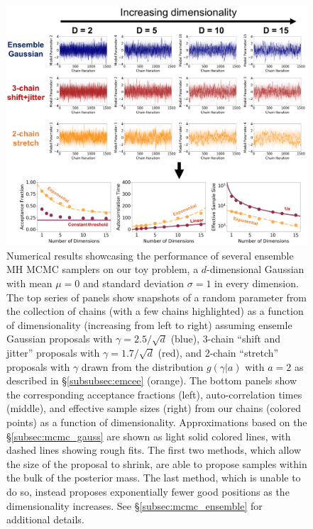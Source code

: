 \documentclass[12pt, titlepage]{article}
\begin{document}
\begin{figure}
\begin{center}
\includegraphics[width=\textwidth]{figures/fig15.png}
\end{center}
\caption{Numerical results showcasing the performance
of several ensemble MH MCMC samplers on our toy problem,
a $d$-dimensional Gaussian with mean $\mu=0$
and standard deviation $\sigma=1$ in every dimension.
The top series of panels show snapshots of a random parameter
from the collection of chains (with a few chains highlighted)
as a function of dimensionality (increasing
from left to right) assuming ensemle Gaussian
proposals with $\gamma=2.5/\sqrt{d}$ (blue), 
3-chain ``shift and jitter''
proposals with $\gamma=1.7/\sqrt{d}$ (red), 
and 2-chain ``stretch'' proposals with
$\gamma$ drawn from the distribution $g(\gamma|a)$ with $a=2$
as described in \S\ref{subsubsec:emcee} (orange).
The bottom panels show the corresponding
acceptance fractions (left), auto-correlation times (middle), and
effective sample sizes (right) from our chains (colored points)
as a function of dimensionality. Approximations based on the 
\S\ref{subsec:mcmc_gauss} are shown as light solid colored lines,
with dashed lines showing rough fits.
The first two methods, which allow the
size of the proposal to shrink, are able to propose samples 
within the bulk of the posterior mass.
The last method, which is unable to do so,
instead proposes exponentially fewer good positions as the
dimensionality increases.
See \S\ref{subsec:mcmc_ensemble} for additional details.
}\label{fig:mcmc_ensemble}
\end{figure}
\end{document}
